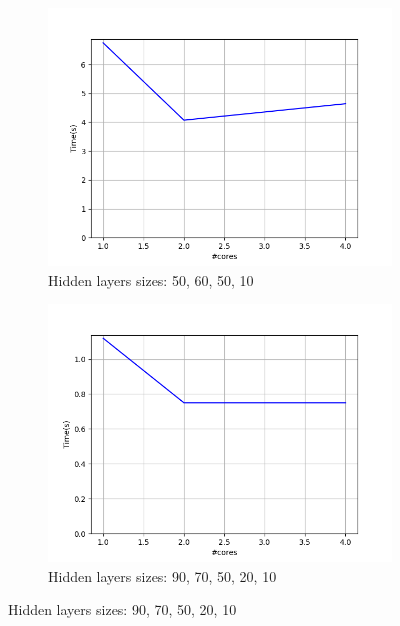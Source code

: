 \documentclass{article}
\begin{document}
\begin{figure}[t]
	\centering
	\hspace*{-9em}
	\begin{subfigure}[t]{.3\textwidth}
		\includegraphics[scale=0.55]{fig/Figure_1.png}
			\parbox{8cm}{\caption{Hidden layers sizes: 50, 60, 50, 10}}
		\label{fig:c1}
	\end{subfigure}\hspace*{9.8em}
	\begin{subfigure}[t]{.3\textwidth}
		\includegraphics[scale=0.55]{fig/Figure_4.png}
		\parbox{8cm}{\caption[long]{Hidden layers sizes: 90, 70, 50, 20, 10}}	\label{fig:c2}
	\end{subfigure}
	

\end{figure}
\end{document}
